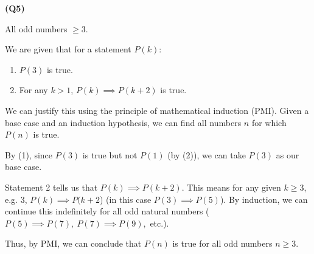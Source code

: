 \documentclass[12pt, a4paper]{article}
\begin{document}
\noindent\textbf{(Q5)}

All odd numbers $\geq 3$.

We are given that for a statement $P(k)$:

\begin{enumerate}
    \item $P(3)$ is true.
    \item For any $k > 1$, $P(k) \implies P(k + 2)$ is true.
\end{enumerate}

We can justify this using the principle of mathematical induction (PMI). Given a base case
and an induction hypothesis, we can find all numbers $n$ for which $P(n)$ is true.

By (1), since $P(3)$ is true but not $P(1)$ (by (2)), we can take $P(3)$ as our base case.

Statement 2 tells us that $P(k) \implies P(k + 2)$. This means for any given $k \geq 3$,
e.g. 3, $P(k) \implies P(k + 2$) (in this case $P(3) \implies P(5)$). By induction, we can continue this indefinitely
for all odd natural numbers ($P(5) \implies P(7), \: P(7) \implies P(9),$ etc.).

Thus, by PMI, we can conclude that $P(n)$ is true for all odd numbers $n \geq 3$.
\end{document}
